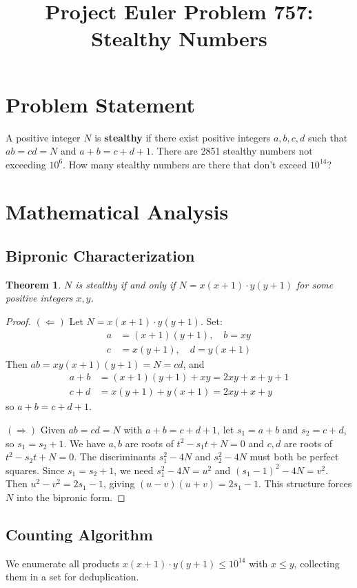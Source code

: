 \documentclass[12pt]{article}
\title{Project Euler Problem 757: Stealthy Numbers}
\author{}
\date{}
\newtheorem{theorem}{Theorem}
\theoremstyle{definition}
\begin{document}
\maketitle

\section{Problem Statement}
A positive integer $N$ is \textbf{stealthy} if there exist positive integers $a, b, c, d$ such that $ab = cd = N$ and $a+b = c+d+1$. There are 2851 stealthy numbers not exceeding $10^6$. How many stealthy numbers are there that don't exceed $10^{14}$?

\section{Mathematical Analysis}

\subsection{Bipronic Characterization}
\begin{theorem}
$N$ is stealthy if and only if $N = x(x+1) \cdot y(y+1)$ for some positive integers $x, y$.
\end{theorem}

\begin{proof}
$(\Leftarrow)$ Let $N = x(x+1) \cdot y(y+1)$. Set:
\begin{align}
a &= (x+1)(y+1), \quad b = xy \\
c &= x(y+1), \quad d = y(x+1)
\end{align}
Then $ab = xy(x+1)(y+1) = N = cd$, and
\begin{align}
a + b &= (x+1)(y+1) + xy = 2xy + x + y + 1 \\
c + d &= x(y+1) + y(x+1) = 2xy + x + y
\end{align}
so $a + b = c + d + 1$.

$(\Rightarrow)$ Given $ab = cd = N$ with $a+b = c+d+1$, let $s_1 = a+b$ and $s_2 = c+d$, so $s_1 = s_2 + 1$. We have $a, b$ are roots of $t^2 - s_1 t + N = 0$ and $c, d$ are roots of $t^2 - s_2 t + N = 0$. The discriminants $s_1^2 - 4N$ and $s_2^2 - 4N$ must both be perfect squares. Since $s_1 = s_2 + 1$, we need $s_1^2 - 4N = u^2$ and $(s_1-1)^2 - 4N = v^2$. Then $u^2 - v^2 = 2s_1 - 1$, giving $(u-v)(u+v) = 2s_1 - 1$. This structure forces $N$ into the bipronic form.
\end{proof}

\subsection{Counting Algorithm}
We enumerate all products $x(x+1) \cdot y(y+1) \leq 10^{14}$ with $x \leq y$, collecting them in a set for deduplication.
\end{document}
